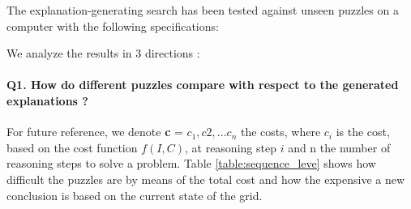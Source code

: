 The explanation-generating search has been tested against unseen puzzles on a computer with the following specifications:

\begin{table}
	\centering
\caption{Computer system specifications}
\label{table:system_specifications}
\end{table}

We analyze the results in 3 directions :

\paragraph{Q1. How do different puzzles compare with respect to the generated explanations ?} For future reference, we denote \textbf{c} = $c_1, c2, ...c_n$ the costs, where $c_i$ is the cost, based on the cost function $f(I, C)$, at reasoning step $i$ and n the number of reasoning steps to solve a problem. Table \ref{table:sequence_leve} shows how difficult the puzzles are by means of the total cost and how the expensive a new conclusion is based on the current state of the grid.

